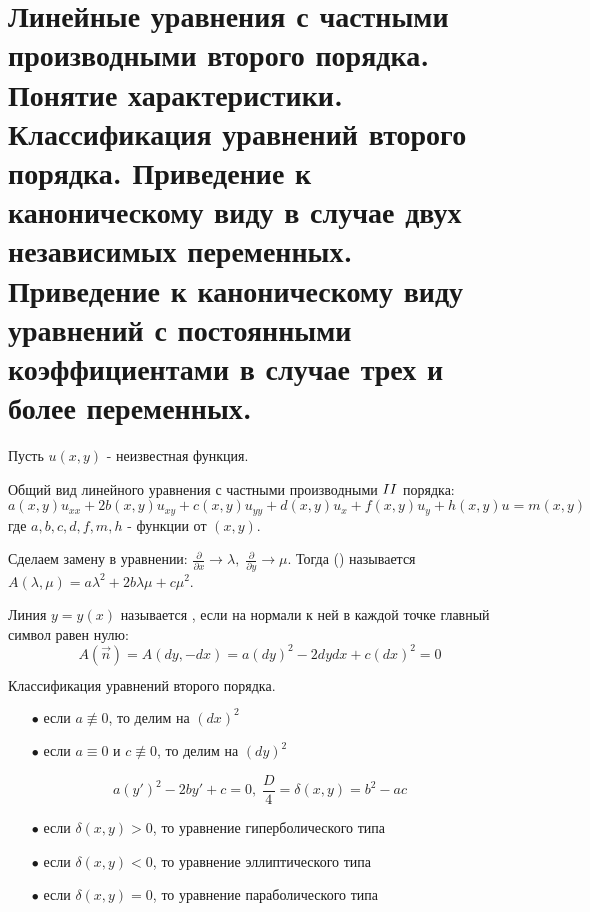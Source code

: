 \chapter{Линейные уравнения с частными производными второго порядка. Понятие характеристики. Классификация уравнений второго порядка. Приведение к каноническому виду в случае двух независимых переменных. Приведение к каноническому виду уравнений с постоянными коэффициентами в случае трех и более переменных.}
\label{cha:1}

Пусть $u(x,y)$ - неизвестная функция.

\begin{definition}\label{cha:1/def:1}
	Общий вид линейного уравнения с частными производными $\RNumb{2}$ порядка:
	$$a(x,y) u_{xx} + 2 b(x,y) u_{xy} + c(x,y) u_{yy} + d(x,y) u_x + f(x,y) u_y + h(x,y) u = m (x,y)$$
	где $a,b,c,d,f,m,h$ - функции от $(x,y)$.
\end{definition}

\begin{definition}\label{cha:1/def:2}
	Сделаем замену в уравнении: $\frac{\partial}{\partial x} \to \lambda, \; \frac{\partial}{\partial y} \to \mu$. Тогда  () называется $A (\lambda, \mu) = a \lambda^2 + 2 b \lambda \mu + c \mu^2$.
\end{definition}

\begin{definition}\label{cha:1/def:3}
	Линия $y = y(x)$ называется , если на нормали к ней в каждой точке главный символ равен нулю:
	$$A(\overrightarrow{n}) = A (dy, -dx) = a (dy)^2 - 2 dy dx + c (dx)^2 = 0$$
\end{definition}

$\textbf{Классификация уравнений второго порядка.}$

\begin{itemize}
	\item[$\bullet$] если $a \not \equiv 0$, то делим на $(dx)^2$
	\item[$\bullet$] если $a \equiv 0$ и $c \not \equiv 0$, то делим на $(dy)^2$
\end{itemize}

$$a (y')^2 - 2 b y' + c = 0, \; \frac{D}{4} = \delta (x,y) = b^2 - a c$$

\begin{itemize}
	\item[$\bullet$] если $\delta (x,y) > 0$, то уравнение гиперболического типа
	\item[$\bullet$] если $\delta (x,y) < 0$, то уравнение эллиптического типа
	\item[$\bullet$] если $\delta (x,y) = 0$, то уравнение параболического типа
\end{itemize}

